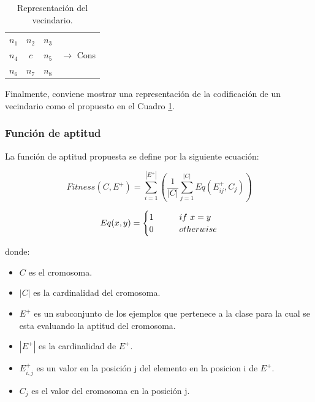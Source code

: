 \begin{table}[H]
	\begin{center}
		\begin{tabular}{ c c c c}
			$n_1$&$n_2$&$n_3$&\\
			$n_4$&$c$&$n_5$& $\rightarrow$ Cons\\
			$n_6$&$n_7$&$n_8$&\\
		\end{tabular}
	\end{center}
	\caption{\label{tab:lrdeaneigh} Representación del vecindario.}
\end{table}

Finalmente, conviene mostrar una representación de la codificación de un vecindario como el propuesto en el Cuadro \ref{tab:lrdeaneigh}.

\begin{table}[H]
	\begin{center}
	\end{center}
	\caption{\label{tab:lredeacod} Representación de la codificación.}
\end{table}

\subsubsection{Función de aptitud}

La función de aptitud propuesta se define por la siguiente ecuación:

\begin{equation}\label{eq:fitness1}
	Fitness(C,E^{+})=\sum_{i=1}^{|E^{+}|} \left(\frac{1}{|C|}\sum_{j=1}^{|C|} Eq(E^{+}_{ij},C_{j}) \right) 
\end{equation}


\begin{equation}\label{eq:fitness2}
Eq(x,y)=
\begin{cases}
\text1 &\qquad if\ x=y \\
\text0 &\qquad otherwise
\end{cases}
\end{equation}

donde:
\begin{itemize}
	\item \(C\) es el cromosoma.
	\item \(|C|\) es la cardinalidad del cromosoma.
	\item \(E^{+}\) es un subconjunto de los ejemplos que pertenece a la clase para la cual se esta evaluando la aptitud del cromosoma.
	\item \(|E^{+}|\) es la cardinalidad de $E^+$.
	\item \(E^{+}_{i,j}\) es un valor en la posición j del elemento en la posicion i de $E^+$.
	\item \(C_{j}\) es el valor del cromosoma en la posición j.
\end{itemize}

